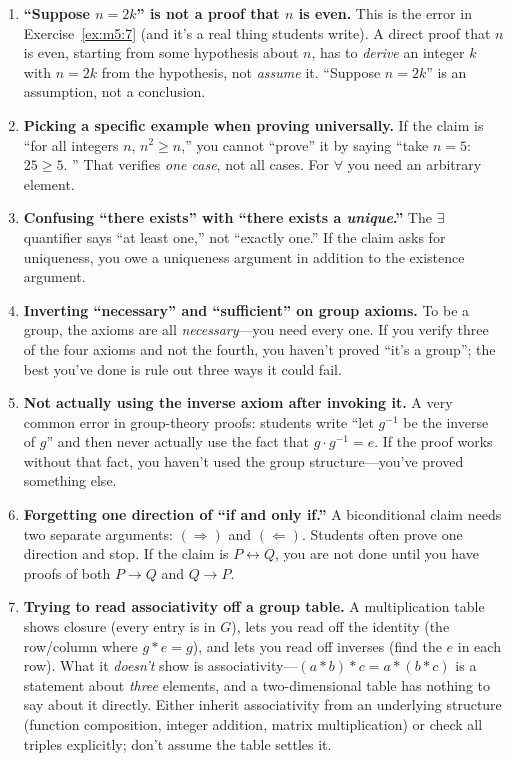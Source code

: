 \documentclass[11pt]{article}
\begin{document}
\begin{enumerate}
  \item \textbf{``Suppose $n = 2k$'' is not a proof that $n$ is even.} This is the error in Exercise~\ref{ex:m5:7} (and it's a real thing students write). A direct proof that $n$ is even, starting from some hypothesis about $n$, has to \emph{derive} an integer $k$ with $n = 2k$ from the hypothesis, not \emph{assume} it. ``Suppose $n = 2k$'' is an assumption, not a conclusion.
  \item \textbf{Picking a specific example when proving universally.} If the claim is ``for all integers $n$, $n^2 \geq n$,'' you cannot ``prove'' it by saying ``take $n = 5$: $25 \geq 5$. \checkmark'' That verifies \emph{one case}, not all cases. For $\forall$ you need an arbitrary element.
  \item \textbf{Confusing ``there exists'' with ``there exists a \emph{unique}.''} The $\exists$ quantifier says ``at least one,'' not ``exactly one.'' If the claim asks for uniqueness, you owe a uniqueness argument in addition to the existence argument.
  \item \textbf{Inverting ``necessary'' and ``sufficient'' on group axioms.} To be a group, the axioms are all \emph{necessary}---you need every one. If you verify three of the four axioms and not the fourth, you haven't proved ``it's a group''; the best you've done is rule out three ways it could fail.
  \item \textbf{Not actually using the inverse axiom after invoking it.} A very common error in group-theory proofs: students write ``let $g^{-1}$ be the inverse of $g$'' and then never actually use the fact that $g \cdot g^{-1} = e$. If the proof works without that fact, you haven't used the group structure---you've proved something else.
  \item \textbf{Forgetting one direction of ``if and only if.''} A biconditional claim needs two separate arguments: $(\Rightarrow)$ and $(\Leftarrow)$. Students often prove one direction and stop. If the claim is $P \leftrightarrow Q$, you are not done until you have proofs of both $P \to Q$ and $Q \to P$.
  \item \textbf{Trying to read associativity off a group table.} A multiplication table shows closure (every entry is in $G$), lets you read off the identity (the row/column where $g * e = g$), and lets you read off inverses (find the $e$ in each row). What it \emph{doesn't} show is associativity---$(a * b) * c = a * (b * c)$ is a statement about \emph{three} elements, and a two-dimensional table has nothing to say about it directly. Either inherit associativity from an underlying structure (function composition, integer addition, matrix multiplication) or check all triples explicitly; don't assume the table settles it.

\end{enumerate}
\end{document}
